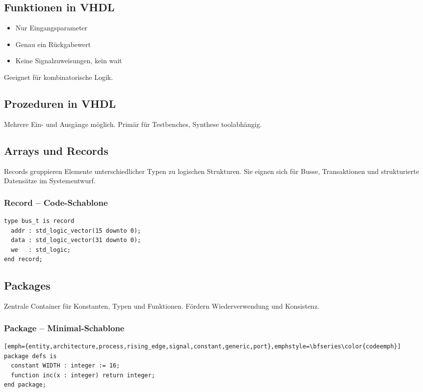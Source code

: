 \documentclass[10pt,a4paper]{article}
\begin{document}
\begin{multicols}{3}
\subsection{Funktionen in VHDL}
\begin{itemize}
  \item Nur Eingangsparameter
  \item Genau ein Rückgabewert
  \item Keine Signalzuweisungen, kein wait
\end{itemize}

Geeignet für kombinatorische Logik.

\subsection{Prozeduren in VHDL}
Mehrere Ein- und Ausgänge möglich.
Primär für Testbenches, Synthese toolabhängig.

\subsection{Arrays und Records}
Records gruppieren Elemente unterschiedlicher Typen zu logischen Strukturen. Sie eignen sich für Busse, Transaktionen und strukturierte Datensätze im Systementwurf.

\subsubsection*{Record – Code-Schablone}
\begin{lstlisting}[emph={entity,architecture,process,rising_edge,signal,constant,generic,port},emphstyle=\bfseries\color{codeemph}]
type bus_t is record
  addr : std_logic_vector(15 downto 0);
  data : std_logic_vector(31 downto 0);
  we   : std_logic;
end record;
\end{lstlisting}

\subsection{Packages}
Zentrale Container für Konstanten, Typen und Funktionen.
Fördern Wiederverwendung und Konsistenz.

\subsubsection*{Package – Minimal-Schablone}
\begin{lstlisting}[emph={entity,architecture,process,rising_edge,signal,constant,generic,port},emphstyle=\bfseries\color{codeemph}][emph={entity,architecture,process,rising_edge,signal,constant,generic,port},emphstyle=\bfseries\color{codeemph}]
package defs is
  constant WIDTH : integer := 16;
  function inc(x : integer) return integer;
end package;


\end{lstlisting}
\end{multicols}
\end{document}
